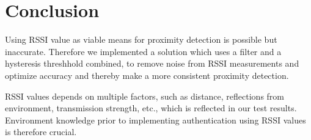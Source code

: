 \section{Conclusion}
Using RSSI value as viable means for proximity detection is possible but inaccurate. Therefore we implemented a solution which uses a filter and a hysteresis threshhold combined, to remove noise from RSSI measurements and optimize accuracy and thereby make a more consistent proximity detection.

RSSI values depends on multiple factors, such as distance, reflections from environment, transmission strength, etc., which is reflected in our test results. Environment knowledge prior to implementing authentication using RSSI values is therefore crucial.

%

